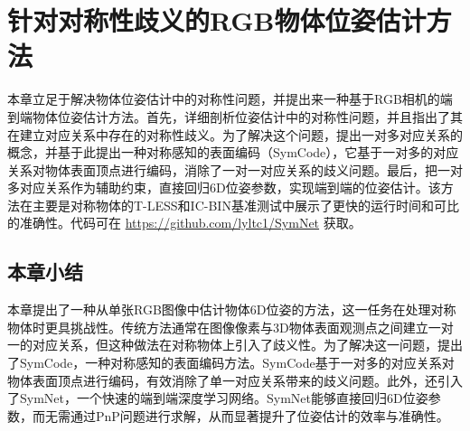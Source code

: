 \chapter{针对对称性歧义的RGB物体位姿估计方法}

本章立足于解决物体位姿估计中的对称性问题，并提出来一种基于RGB相机的端到端物体位姿估计方法。首先，详细剖析位姿估计中的对称性问题，并且指出了其在建立对应关系中存在的对称性歧义。为了解决这个问题，提出一对多对应关系的概念，并基于此提出一种对称感知的表面编码（SymCode），它基于一对多的对应关系对物体表面顶点进行编码，消除了一对一对应关系的歧义问题。最后，把一对多对应关系作为辅助约束，直接回归6D位姿参数，实现端到端的位姿估计。该方法在主要是对称物体的T-LESS和IC-BIN基准测试中展示了更快的运行时间和可比的准确性。代码可在 \href{https://github.com/lyltc1/SymNet}{https://github.com/lyltc1/SymNet} 获取。


\section{本章小结}
本章提出了一种从单张RGB图像中估计物体6D位姿的方法，这一任务在处理对称物体时更具挑战性。传统方法通常在图像像素与3D物体表面观测点之间建立一对一的对应关系，但这种做法在对称物体上引入了歧义性。为了解决这一问题，提出了SymCode，一种对称感知的表面编码方法。SymCode基于一对多的对应关系对物体表面顶点进行编码，有效消除了单一对应关系带来的歧义问题。此外，还引入了SymNet，一个快速的端到端深度学习网络。SymNet能够直接回归6D位姿参数，而无需通过PnP问题进行求解，从而显著提升了位姿估计的效率与准确性。